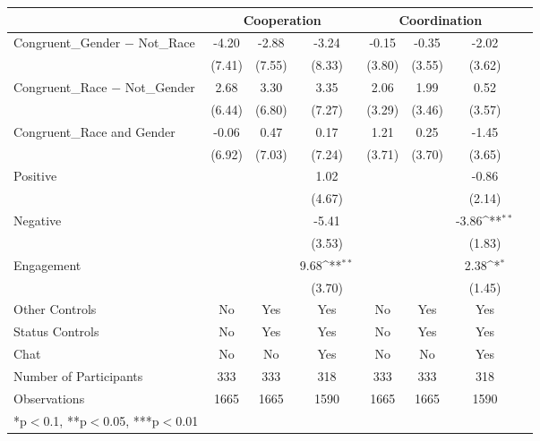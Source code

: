 {\tiny
\def\sym#1{\ifmmode^{#1}\else\(^{#1}\)\fi}
\begin{tabular}{l*{7}{c}}
\toprule
          & \multicolumn{3}{c}{Cooperation}   &\multicolumn{3}{c}{Coordination}     \\
\midrule
Congruent_{Gender} $-$ Not_{Race}   &     -4.20 &  -2.88    &  -3.24 & -0.15 &  -0.35  &  -2.02 \\
                 &     (7.41)  &  (7.55)      &  (8.33) &  (3.80)    &  (3.55)           &  (3.62) \\
\addlinespace
Congruent_{Race} $-$ Not_{Gender}   &    2.68   &   3.30      &  3.35  &  2.06   &   1.99    &  0.52   \\
                &      (6.44)   &   (6.80)    &  (7.27) &      (3.29)    &   (3.46) &  (3.57) \\
\addlinespace
Congruent_{Race and Gender}  &      -0.06   &  0.47    &  0.17  &      1.21       &  0.25                & -1.45  \\
     &      (6.92)    &  (7.03)    &  (7.24)  &      (3.71)    &  (3.70)            &  (3.65)  \\
\addlinespace
Positive          &        &          &  1.02   &        &          &  -0.86  \\
                  &         &         &  (4.67) &         &         &  (2.14)  \\
\addlinespace
Negative        &              &    &  -5.41    &                 &     & -3.86\sym{**}  \\
                &             &     &  (3.53)   &                 &     &  (1.83)  \\
\addlinespace
Engagement     &         &                    &  9.68\sym{**} &  &    &  2.38\sym{*}   \\
                &            &                    &  (3.70)   &   &    &  (1.45) \\

\midrule
Other Controls   &    No       &    Yes   &    Yes  &    No       &    Yes          &    Yes         \\
Status Controls   &    No     &    Yes      &    Yes   &    No        &    Yes          &    Yes       \\
Chat     &    No         &    No           &    Yes    &No         &    No           &    Yes           \\
\midrule
Number of Participants   &    333   &    333   &    318    &    333   &    333   &    318      \\
\midrule
Observations &     1665  &  1665    &  1590  &     1665  &  1665    &  1590       \\
\bottomrule
*p$<$0.1, **p$<$0.05, ***p$<$0.01
\end{tabular}
}
